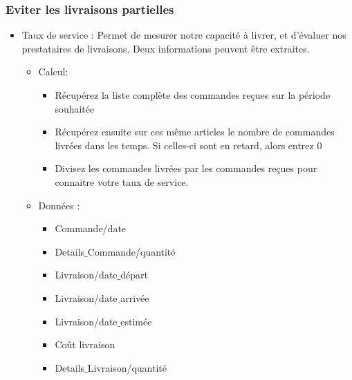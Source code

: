 \subsubsection{Eviter les livraisons partielles} 

\begin{itemize}


	\item Taux de service :  Permet de mesurer notre capacité à livrer, et d’évaluer nos prestataires de livraisons.  Deux informations peuvent être extraites. 
	
		\begin{itemize}
		
			\item Calcul:  
			
				\begin{itemize}
				
					\item Récupérez la liste complète des commandes reçues sur la période souhaitée 

					\item Récupérez ensuite sur ces même articles le nombre de commandes livrées dans les temps. Si celles-ci sont en retard, alors entrez 0%

					\item Divisez les commandes livrées par les commandes reçues pour connaitre votre taux de service. 
				
				
				\end{itemize}		
								
			\item Données : 
				
				\begin{itemize}
				
					\item Commande/date 

					\item Details$\_$Commande/quantité 

					\item Livraison/date$\_$départ 

					\item Livraison/date$\_$arrivée 

					\item Livraison/date$\_$estimée 

					\item Coût livraison 

					\item Details$\_$Livraison/quantité 


\end{itemize}
\end{itemize}
\end{itemize}
